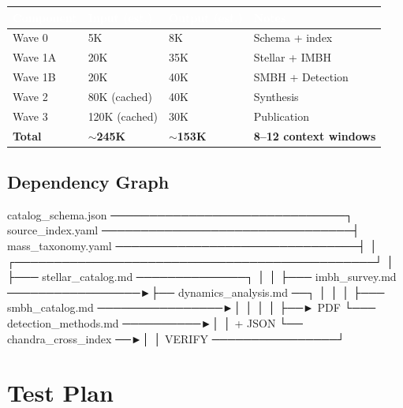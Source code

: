 \documentclass[11pt,letterpaper]{article}
\newcommand{\tableheader}[1]{\textbf{\sffamily\textcolor{white}{#1}}}
\begin{document}
\begin{center}
\begin{tabularx}{\textwidth}{L{4cm}C{2.5cm}C{2.5cm}X}
\toprule
{}
\tableheader{Component} & \tableheader{Input (est.)} & \tableheader{Output (est.)} & \tableheader{Notes} \\
\midrule
Wave 0 & 5K & 8K & Schema + index \\
Wave 1A & 20K & 35K & Stellar + IMBH \\
Wave 1B & 20K & 40K & SMBH + Detection \\
Wave 2 & 80K (cached) & 40K & Synthesis \\
Wave 3 & 120K (cached) & 30K & Publication \\
\midrule
\textbf{Total} & \textbf{$\sim$245K} & \textbf{$\sim$153K} & \textbf{8--12 context windows} \\
\bottomrule
\end{tabularx}
\end{center}

\subsection{Dependency Graph}

\begin{asciibox}
catalog_schema.json ──────────────────────────────┐
source_index.yaml ────────────────────────────────┤
mass_taxonomy.yaml ───────────────────────────────┤
                                                   │
    ┌──────────────────────────────────────────────┘
    │
    ├─── stellar_catalog.md ──────────────┐
    │                                     │
    ├─── imbh_survey.md ─────────────────►├── dynamics_analysis.md ──┐
    │                                     │                           │
    ├─── smbh_catalog.md ────────────────►│                           │
    │                                     │                           ├──► PDF
    └─── detection_methods.md ──────────►│                           │   + JSON
                                          └── chandra_cross_index ──►│
                                                                       │
                                               VERIFY ────────────────┘
\end{asciibox}

\section{Test Plan}
\end{document}

